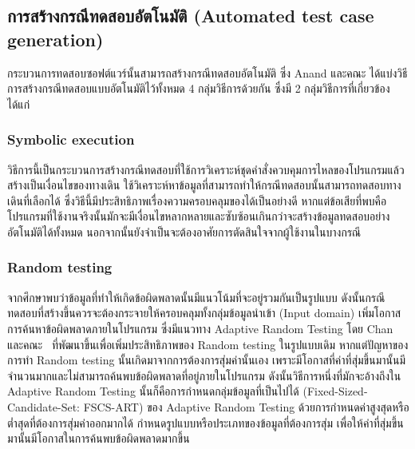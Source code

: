 \subsection{การสร้างกรณีทดสอบอัตโนมัติ (Automated test case generation)}
\label{sub:tcgen}

กระบวนการทดสอบซอฟต์แวร์นั้นสามารถสร้างกรณีทดสอบอัตโนมัติ ซึ่ง Anand และคณะ \cite{Anand2013} ได้แบ่งวิธีการสร้างกรณีทดสอบแบบอัตโนมัติไว้ทั้งหมด 
4 กลุ่มวิธีการด้วยกัน ซึ่งมี 2 กลุ่มวิธีการที่เกี่ยวข้องได้แก่

\subsubsection{Symbolic execution}
\label{sub:tcgen:sub:symbolic}

วิธีการนี้เป็นกระบวนการสร้างกรณีทดสอบที่ใช้การวิเคราะห์ชุดคำสั่งควบคุมการไหลของโปรแกรมแล้วสร้างเป็นเงื่อนไขของทางเดิน 
ใช้วิเคราะห์หาข้อมูลที่สามารถทำให้กรณีทดสอบนั้นสามารถทดสอบทางเดินที่เลือกได้ ซึ่งวิธีนี้มีประสิทธิภาพเรื่องความครอบคลุมของ{\sourcecode}ได้เป็นอย่างดี
หากแต่ข้อเสียที่พบคือ โปรแกรมที่ใช้งานจริงนั้นมักจะมีเงื่อนไขหลากหลายและซับซ้อนเกินกว่าจะสร้างข้อมูลทดสอบอย่างอัตโนมัติได้ทั้งหมด 
นอกจากนั้นยังจำเป็นจะต้องอาศัยการตัดสินใจจากผู้ใช้งานในบางกรณี

\subsubsection{Random testing}
\label{sub:tcgen:sub:random}

จากศึกษาพบว่าข้อมูลที่ทำให้เกิดข้อผิดพลาดนั้นมีแนวโน้มที่จะอยู่รวมกันเป็นรูปแบบ %
ดังนั้นกรณีทดสอบที่สร้างขึ้นควรจะต้องกระจายให้ครอบคลุมทั้งกลุ่มข้อมูลนำเข้า (Input domain) เพิ่มโอกาสการค้นหาข้อผิดพลาดภายในโปรแกรม 
ซึ่งมีแนวทาง Adaptive Random Testing โดย Chan และคณะ \cite{Chan2004}\ ที่พัฒนาขึ้นเพื่อเพิ่มประสิทธิภาพของ Random testing ในรูปแบบเดิม 
หากแต่ปัญหาของการทำ Random testing นั้นเกิดมาจากการต้องการสุ่มค่านั้นเอง 
เพราะมีโอกาสที่ค่าที่สุ่มขึ้นมานั้นมีจำนวนมากและไม่สามารถค้นพบข้อผิดพลาดที่อยู่ภายในโปรแกรม ดังนั้นวิธีการหนึ่งที่มักจะอ้างถึงใน Adaptive Random Testing 
นั้นก็คือการกำหนดกลุ่มข้อมูลที่เป็นไปได้ (Fixed-Sized-Candidate-Set: FSCS-ART) ของ Adaptive Random Testing 
ด้วยการกำหนดค่าสูงสุดหรือต่ำสุดที่ต้องการสุ่มค่าออกมากได้ กำหนดรูปแบบหรือประเภทของข้อมูลที่ต้องการสุ่ม 
เพื่อให้ค่าที่สุ่มขึ้นมานั้นมีโอกาสในการค้นพบข้อผิดพลาดมากขึ้น %
